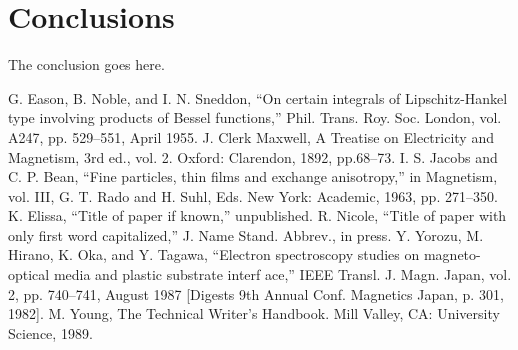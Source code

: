 \documentclass[conference]{IEEEtran}
\begin{document}

\section{Conclusions}
The conclusion goes here.

\begin{thebibliography}{plain}
 G. Eason, B. Noble, and I. N. Sneddon, ``On certain integrals of Lipschitz-Hankel type involving products of Bessel functions,'' Phil. Trans. Roy. Soc. London, vol. A247, pp. 529--551, April 1955.
 J. Clerk Maxwell, A Treatise on Electricity and Magnetism, 3rd ed., vol. 2. Oxford: Clarendon, 1892, pp.68--73.
 I. S. Jacobs and C. P. Bean, ``Fine particles, thin films and exchange anisotropy,'' in Magnetism, vol. III, G. T. Rado and H. Suhl, Eds. New York: Academic, 1963, pp. 271--350.
 K. Elissa, ``Title of paper if known,'' unpublished.
 R. Nicole, ``Title of paper with only first word capitalized,'' J. Name Stand. Abbrev., in press.
 Y. Yorozu, M. Hirano, K. Oka, and Y. Tagawa, ``Electron spectroscopy studies on magneto-optical media and plastic substrate interf	ace,'' IEEE Transl. J. Magn. Japan, vol. 2, pp. 740--741, August 1987 [Digests 9th Annual Conf. Magnetics Japan, p. 301, 1982].
 M. Young, The Technical Writer's Handbook. Mill Valley, CA: University Science, 1989.
\end{thebibliography}
\end{document}
